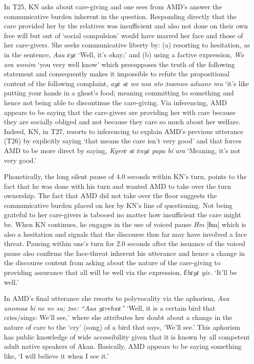 \documentclass[output=paper,colorlinks,citecolor=brown]{langscibook}
\begin{document}
In T25, KN asks about care-giving and one sees from AMD’s answer the communicative burden inherent in the question. Responding directly that the care provided her by the relatives was insufficient and also not done on their own free will but out of ‘social compulsion’ would have marred her face and those of her care-givers. She seeks communicative liberty by: (a) resorting to hesitation, as in the sentence, \textit{Aaa ɛyɛ} ‘Well, it’s okay;’ and (b) using a factive expression, \textit{Wo ara wonim} ‘you very well know’ which presupposes the truth of the following statement and consequently makes it impossible to refute the propositional content of the following complaint, \textit{ayɛ sɛ wo nsa ato ɔsaman aduane mu} ‘it’s like putting your hands in a ghost’s food; meaning committing to something and hence not being able to discontinue the care-giving. Via inferencing, AMD appears to be saying that the care-givers are providing her with care because they are socially obliged and not because they care so much about her welfare. Indeed, KN, in T27, resorts to inferencing to explain AMD’s previous utterance (T26) by explicitly saying ‘that means the care isn’t very good’ and that forces AMD to be more direct by saying, \textit{Kyerɛ sɛ ɛnyɛ papa bi ara} ‘Meaning, it’s not very good.’ 

Phonetically, the long silent pause of 4.0 seconds within KN’s turn, points to the fact that he was done with his turn and wanted AMD to take over the turn ownership. The fact that AMD did not take over the floor suggests the communicative burden placed on her by KN’s line of questioning. Not being grateful to her care-givers is tabooed no matter how insufficient the care might be. When KN continues, he engages in the use of voiced pause \textit{Hm} [ɦm] which is also a hesitation and signals that the discourse thus far may have involved a face threat. Pausing within one’s turn for 2.0 seconds after the issuance of the voiced pause also confirms the face-threat inherent his utterance and hence a change in the discourse content from asking about the nature of the care-giving to providing assurance that all will be well via the expression, \textit{Ɛbɛyɛ yie.} ‘It’ll be well.’

In AMD’s final utterance she resorts to polyvocality via the aphorism, \textit{Aaa anomaa bi ne ne su; ɔse: “Aaa yɛrehwɛ”} ‘Well, it is a certain bird that cries/sings: We’ll see,’ where she attributes her doubt about a change in the nature of care to the ‘cry’ (song) of a bird that says, ‘We’ll see.’ This aphorism has public knowledge of wide accessibility given that it is known by all competent adult native speakers of Akan. Basically, AMD appears to be saying something like, ‘I will believe it when I see it.’
\end{document}
